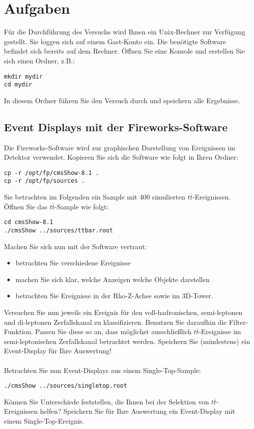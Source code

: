 \section{Aufgaben}
F\"ur die Durchf\"uhrung des Versuchs wird Ihnen ein Unix-Rechner zur Verf\"ugung gestellt. Sie loggen sich auf einem Gast-Konto ein. Die ben\"otigte Software befindet sich bereits auf dem Rechner. \"Offnen Sie eine Konsole und erstellen Sie sich einen Ordner, z.B.:
\begin{lstlisting}
mkdir mydir
cd mydir
\end{lstlisting}
In diesem Ordner f\"uhren Sie den Versuch durch und speichern alle Ergebnisse.
\subsection{Event Displays mit der Fireworks-Software}
Die Fireworks-Software wird zur graphischen Darstellung von Ereignissen im Detektor verwendet. Kopieren Sie sich die Software wie folgt in Ihren Ordner:
\begin{lstlisting}
cp -r /opt/fp/cmsShow-8.1 .
cp -r /opt/fp/sources .
\end{lstlisting}
Sie betrachten im Folgenden ein Sample mit 400 simulierten $t\bar{t}$-Ereignissen. \"Offnen Sie das $t\bar{t}$-Sample wie folgt:
\begin{lstlisting}
cd cmsShow-8.1
./cmsShow ../sources/ttbar.root
\end{lstlisting}
Machen Sie sich nun mit der Software vertraut:
\begin{itemize}
\item betrachten Sie verschiedene Ereignisse
\item machen Sie sich klar, welche Anzeigen welche Objekte darstellen
\item betrachten Sie Ereignisse in der Rho-Z-Achse sowie im 3D-Tower.
\end{itemize}
Versuchen Sie nun jeweils ein Ereignis f\"ur den voll-hadronischen, semi-leptonen und di-leptonen Zerfallskanal zu klassifizieren. Benutzen Sie daraufhin die Filter-Funktion. Passen Sie diese so an, dass m\"oglichst ausschlie{\ss}lich $t\bar{t}$-Ereignisse im semi-leptonischen Zerfallskanal betrachtet werden. Speichern Sie (mindestens) ein Event-Display f\"ur Ihre Auswertung!\\
\\
Betrachten Sie nun Event-Displays aus einem Single-Top-Sample:
\begin{lstlisting}
./cmsShow ../sources/singletop.root
\end{lstlisting}
K\"onnen Sie Unterschiede feststellen, die Ihnen bei der Selektion von $t\bar{t}$-Ereignissen helfen? Speichern Sie f\"ur Ihre Auswertung ein Event-Display mit einem Single-Top-Ereignis.

